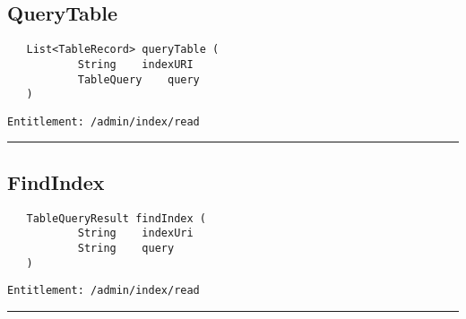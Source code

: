 \subsection{QueryTable}
\label{Api:QueryTable}
\begin{verbatim}
   List<TableRecord> queryTable (
           String    indexURI
           TableQuery    query
   )
\end{verbatim}
\begin{Verbatim}[fontsize=\small, formatcom=\color{Maroon}]
  Entitlement: /admin/index/read
\end{Verbatim}



\rule{12cm}{2pt}
\subsection{FindIndex}
\label{Api:FindIndex}
\begin{verbatim}
   TableQueryResult findIndex (
           String    indexUri
           String    query
   )
\end{verbatim}
\begin{Verbatim}[fontsize=\small, formatcom=\color{Maroon}]
  Entitlement: /admin/index/read
\end{Verbatim}



\rule{12cm}{2pt}
